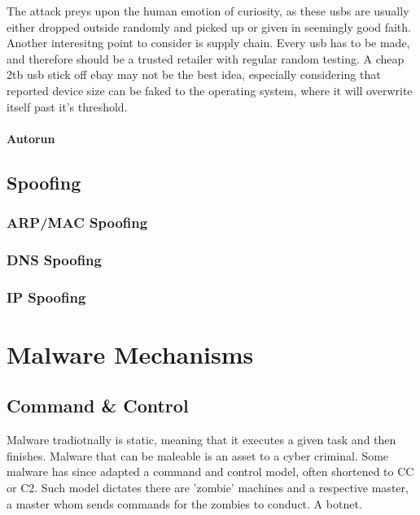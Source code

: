 The attack preys upon the human emotion of curiosity, as these usbs are usually either dropped outside randomly and picked up or given in seemingly good faith. Another interesitng point to consider is supply chain.
Every usb has to be made, and therefore should be a trusted retailer with regular random testing. A cheap 2tb usb stick off ebay may not be the best idea, especially considering that reported device size can be faked to the operating system,
where it will overwrite itself past it's threshold.

\subsubsection{Autorun}
\section{Spoofing}
\subsection{ARP/MAC Spoofing}
\subsection{DNS Spoofing}
\subsection{IP Spoofing}



\chapter{Malware Mechanisms}

\section{Command \& Control}
Malware tradiotnally is static, meaning that it executes a given task and then finishes. Malware that can be maleable is an asset to a cyber criminal. 
Some malware has since adapted a command and control model, often shortened to CC or C2. Such model dictates there are 'zombie' machines and a respective master, a master whom sends commands for the zombies to conduct. A botnet.

